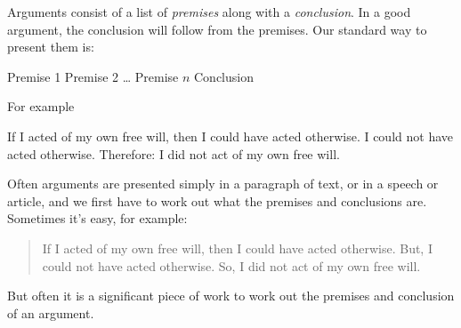 Arguments consist of a list of \emph{premises} along with a \emph{conclusion}. In a good argument, the conclusion will follow from the premises. 
Our standard way to present them is:
\begin{earg}
\prem Premise 1
\prem Premise 2
\prem \dots
\prem Premise $n$
\conc Conclusion
\end{earg}
For	example
	\begin{earg}
	\prem If I acted of my own free will, then I could have acted otherwise.
	\prem I could not have acted otherwise. 
	\conc Therefore: I did not act of my own free will. 
	\end{earg}


Often arguments are presented simply in a paragraph of text, or in a speech or article, and we first have to work out what the premises and conclusions are. 
Sometimes it's easy, for example:
\begin{quote}
	If I acted of my own free will, then I could have acted otherwise.
	But, I could not have acted otherwise. 
	So, I did not act of my own free will.
\end{quote}
But often it is a significant piece of work to work out the premises and conclusion of an argument. 





